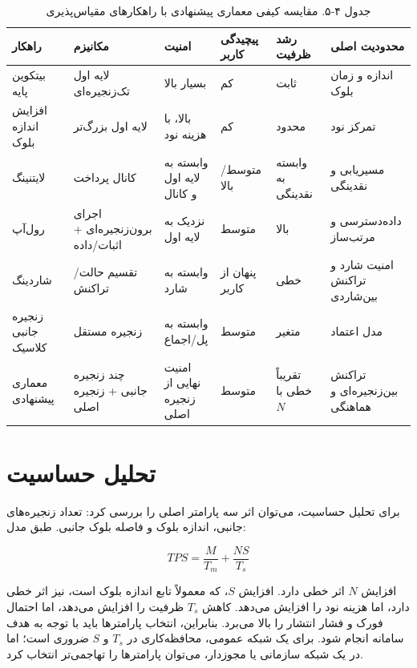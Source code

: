 \begin{table}[h]
\centering
\caption{جدول ۴-۵. مقایسه کیفی معماری پیشنهادی با راهکارهای مقیاس‌پذیری}
\small
\begin{tabular}{|p{1.8cm}|p{1.6cm}|p{1.6cm}|p{1.6cm}|p{1.6cm}|p{1.8cm}|}
\hline
راهکار & مکانیزم & امنیت & پیچیدگی کاربر & رشد ظرفیت & محدودیت اصلی \\
\hline
بیتکوین پایه & لایه اول تک‌زنجیره‌ای & بسیار بالا & کم & ثابت & اندازه و زمان بلوک \\
\hline
افزایش اندازه بلوک & لایه اول بزرگ‌تر & بالا، با هزینه نود & کم & محدود & تمرکز نود \\
\hline
لایتنینگ & کانال پرداخت & وابسته به لایه اول و کانال & متوسط/بالا & وابسته به نقدینگی & مسیریابی و نقدینگی \\
\hline
رول‌آپ & اجرای برون‌زنجیره‌ای + اثبات/داده & نزدیک به لایه اول & متوسط & بالا & داده‌دسترسی و مرتب‌ساز \\
\hline
شاردینگ & تقسیم حالت/تراکنش & وابسته به شارد & پنهان از کاربر & خطی & امنیت شارد و تراکنش بین‌شاردی \\
\hline
زنجیره جانبی کلاسیک & زنجیره مستقل & وابسته به پل/اجماع & متوسط & متغیر & مدل اعتماد \\
\hline
معماری پیشنهادی & چند زنجیره جانبی + زنجیره اصلی & امنیت نهایی از زنجیره اصلی & متوسط & تقریباً خطی با \(N\) & تراکنش بین‌زنجیره‌ای و هماهنگی \\
\hline
\end{tabular}
\end{table}

\section{تحلیل حساسیت}

برای تحلیل حساسیت، می‌توان اثر سه پارامتر اصلی را بررسی کرد: تعداد زنجیره‌های جانبی، اندازه بلوک و فاصله بلوک جانبی. طبق مدل:

\begin{latin}
\[
TPS = \frac{M}{T_m} + \frac{NS}{T_s}
\]
\end{latin}

افزایش \(N\) اثر خطی دارد. افزایش \(S\)، که معمولاً تابع اندازه بلوک است، نیز اثر خطی دارد، اما هزینه نود را افزایش می‌دهد. کاهش \(T_s\) ظرفیت را افزایش می‌دهد، اما احتمال فورک و فشار انتشار را بالا می‌برد. بنابراین، انتخاب پارامترها باید با توجه به هدف سامانه انجام شود. برای یک شبکه عمومی، محافظه‌کاری در \(T_s\) و \(S\) ضروری است؛ اما در یک شبکه سازمانی یا مجوزدار، می‌توان پارامترها را تهاجمی‌تر انتخاب کرد.

